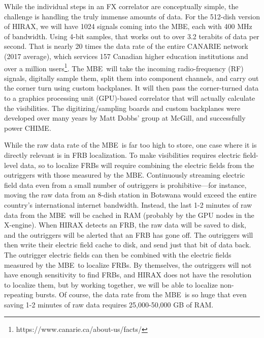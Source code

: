 \documentclass[11pt]{article}
\newcommand{\mbe}{{\rm MBE}}
\begin{document}
While the individual steps in an FX correlator are conceptually
simple, the challenge is handling the truly immense amounts of data.
For the 512-dish version of HIRAX, we will have 1024 signals coming
into the \mbe, each with 400 MHz of bandwidth.  Using 4-bit
samples, that works out to over 3.2 terabits of data per second.  That
is nearly 20 times the data rate of the entire CANARIE network (2017
average), which services 157 Canadian higher education institutions
and over a million
users\footnote{https://www.canarie.ca/about-us/facts/}.  The
\mbe\ will take the incoming radio-frequency (RF) signals, digitally
sample them, split them into component channels, and carry out the
corner turn using custom backplanes.  It will then pass the
corner-turned data to a graphics processing unit (GPU)-based
correlator that will actually calculate the visibilities.  The
digitizing/sampling boards and custom backplanes were developed over
many years by Matt Dobbs' group at McGill, and successfully power CHIME.

While the raw data rate of the \mbe\ is far too high to store, one
case where it is directly relevant is in FRB localization.  To make
visibilities requires electric field-level data, so to localize FRBs
will require combining the electric fields from the outriggers with
those measured by the \mbe.  Continuously streaming electric field
data even from a small number of outriggers is prohibitive---for
instance, moving the raw data from an 8-dish station in Botswana would
exceed the entire country's international internet bandwidth.
Instead, the last 1-2 minutes of raw data from the \mbe\ will be
cached in RAM (probably by the GPU nodes in the X-engine).  When HIRAX
detects an FRB, the raw data will be saved to disk, and the outriggers
will be alerted that an FRB has gone off.  The outriggers will then
write their electric field cache to disk, and send just that bit of
data back.  The outrigger electric fields can then be combined with
the electric fields measured by the \mbe\ to localize FRBs.  By
themselves, the outriggers will not have enough sensitivity to find
FRBs, and HIRAX does not have the resolution to localize them, but by
working together, we will be able to localize non-repeating bursts.
Of course, the data rate from the \mbe\ is so huge that even saving
1-2 minutes of raw data requires 25,000-50,000 GB of RAM.

\end{document}
